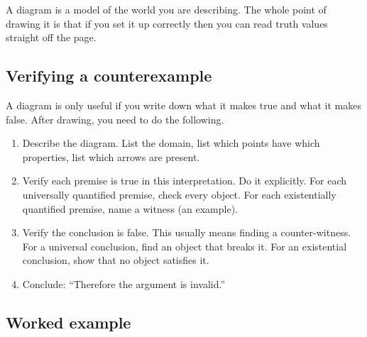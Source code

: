 \documentclass[11pt]{article}
\begin{document}
A diagram is a model of the world you are describing. The whole point of drawing it is that if you set it up correctly then you can read truth values straight off the page.

\subsection{Verifying a counterexample}

A diagram is only useful if you write down what it makes true and what it makes false. After drawing, you need to do the following.

\begin{template}
\begin{enumerate}
    \item Describe the diagram. List the domain, list which points have which properties, list which arrows are present.
    \item Verify each premise is true in this interpretation. Do it explicitly. For each universally quantified premise, check every object. For each existentially quantified premise, name a witness (an example).
    \item Verify the conclusion is false. This usually means finding a counter-witness. For a universal conclusion, find an object that breaks it. For an existential conclusion, show that no object satisfies it.
    \item Conclude: ``Therefore the argument is invalid.''
\end{enumerate}
\end{template}

\subsection{Worked example}
\end{document}
